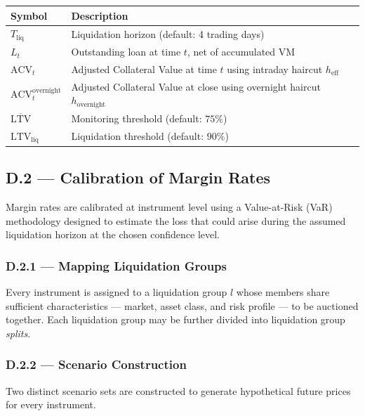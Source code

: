 \documentclass[9pt, a4paper]{extarticle}
\newcommand{\vartableheader}{%
    \textbf{Symbol} & \textbf{Description}\\
}
\begin{document}
\begin{tabularx}{\linewidth}{lX}
\toprule
\vartableheader
\midrule
$T_{\text{liq}}$                    & Liquidation horizon (default: 4 trading days) \\
$L_t$                               & Outstanding loan at time $t$, net of accumulated VM \\
$\mathrm{ACV}_t$                    & Adjusted Collateral Value at time $t$ using intraday haircut $h_{\text{eff}}$ \\
$\mathrm{ACV}_t^{\text{overnight}}$ & Adjusted Collateral Value at close using overnight haircut $h_{\text{overnight}}$ \\
$\overline{\mathrm{LTV}}$           & Monitoring threshold (default: $75\%$) \\
$\mathrm{LTV}_{\text{liq}}$         & Liquidation threshold (default: $90\%$) \\
\bottomrule
\end{tabularx}

\newpage

\subsection{D.2 — Calibration of Margin Rates}

Margin rates are calibrated at instrument level using a Value-at-Risk (VaR)
methodology designed to estimate the loss that could arise during the assumed
liquidation horizon at the chosen confidence level.

\subsubsection{D.2.1 — Mapping Liquidation Groups}

Every instrument is assigned to a liquidation group $l$ whose members share
sufficient characteristics — market, asset class, and risk profile — to be
auctioned together. Each liquidation group may be further divided into
liquidation group \textit{splits}.

\subsubsection{D.2.2 — Scenario Construction}

Two distinct scenario sets are constructed to generate hypothetical future
prices for every instrument.
\end{document}
